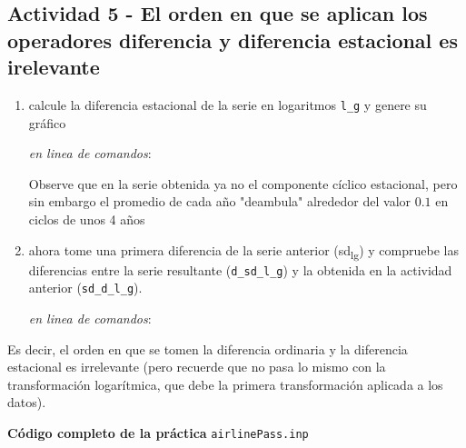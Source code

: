 \documentclass[11pt]{article}
\begin{document}
\subsection{Actividad 5 - El orden en que se aplican los operadores diferencia y diferencia estacional es irelevante}
\label{sec:org7365299}

\begin{enumerate}
\item calcule la diferencia estacional de la serie en logaritmos \texttt{l\_g} y
genere su gráfico

{\vspace{0pt} \footnotesize \color{gray!70!black}
\emph{en linea de comandos}: 
}

Observe que en la serie obtenida ya no el componente cíclico
estacional, pero sin embargo el promedio de cada año "deambula"
alrededor del valor \(0.1\) en ciclos de unos 4 años

\item ahora tome una primera diferencia de la serie anterior (sd\textsubscript{l}\textsubscript{g}) y
compruebe las diferencias entre la serie resultante (\texttt{d\_sd\_l\_g}) y
la obtenida en la actividad anterior (\texttt{sd\_d\_l\_g}).

{\vspace{0pt} \footnotesize \color{gray!70!black}
\emph{en linea de comandos}: 
}
\end{enumerate}

Es decir, el orden en que se tomen la diferencia ordinaria y la
diferencia estacional es irrelevante (pero recuerde que no pasa lo
mismo con la transformación logarítmica, que debe la primera
transformación aplicada a los datos).

\vspace{10pt}
\noindent
\textbf{Código completo de la práctica} \texttt{airlinePass.inp}
\vspace{10pt}

\clearpage
\end{document}

